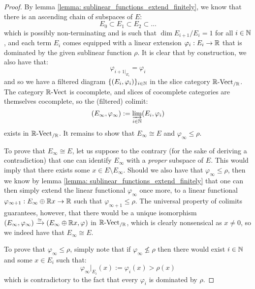             \begin{proof}
                By lemma \ref{lemma: sublinear_functions_extend_finitely}, we know that there is an ascending chain of subspaces of $E$:
                    $$E_0 \subset E_1 \subset E_2 \subset ...$$
                which is possibly non-terminating and is such that $\dim E_{i + 1}/E_i = 1$ for all $i \in \mathbb{N}$, and each term $E_i$ comes equipped with a linear extension $\varphi_i: E_i \to \mathbb{R}$ that is dominated by the given sublinear function $\rho$. It is clear that by construction, we also have that:
                    $$\varphi_{i + 1|_{E_i}} = \varphi_i$$
                and so we have a filtered diagram $\{(E_i, \varphi_i)\}_{i \in \mathbb{N}}$ in the slice category $\mathbb{R}\text{-}\mathrm{Vect}_{/\mathbb{R}}$. The category $\mathbb{R}\text{-}\mathrm{Vect}$ is cocomplete, and slices of cocomplete categories are themselves cocomplete, so the (filtered) colimit:
                    $$(E_{\infty}, \varphi_{\infty}) := \varinjlim_{i \in \mathbb{N}} (E_i, \varphi_i)$$
                exists in $\mathbb{R}\text{-}\mathrm{Vect}_{/\mathbb{R}}$. It remains to show that $E_{\infty} \cong E$ and $\varphi_{\infty} \leq \rho$.

                To prove that $E_{\infty} \cong E$, let us suppose to the contrary (for the sake of deriving a contradiction) that one can identify $E_{\infty}$ with a \textit{proper} subspace of $E$. This would imply that there exists some $x \in E \setminus E_{\infty}$. Should we also have that $\varphi_{\infty} \leq \rho$, then we know by lemma \ref{lemma: sublinear_functions_extend_finitely} that one can then simply extend the linear functional $\varphi_{\infty}$ once more, to a linear functional $\varphi_{\infty + 1}: E_{\infty} \oplus \mathbb{R} x \to \mathbb{R}$ such that $\varphi_{\infty + 1} \leq \rho$. The universal property of colimits guarantees, however, that there would be a unique isomorphism $(E_{\infty}, \varphi_{\infty}) \xrightarrow[]{\simeq} (E_{\infty} \oplus \mathbb{R} x, \varphi_{})$ in $\mathbb{R}\text{-}\mathrm{Vect}_{/\mathbb{R}}$, which is clearly nonsensical as $x \not = 0$, so we indeed have that $E_{\infty} \cong E$.

                To prove that $\varphi_{\infty} \leq \rho$, simply note that if $\varphi_{\infty} \not \leq \rho$ then there would exist $i \in \mathbb{N}$ and some $x \in E_i$ such that:
                    $$\varphi_{\infty}|_{E_i}(x) := \varphi_i(x) > \rho(x)$$
                which is contradictory to the fact that every $\varphi_i$ is dominated by $\rho$.
            \end{proof}
